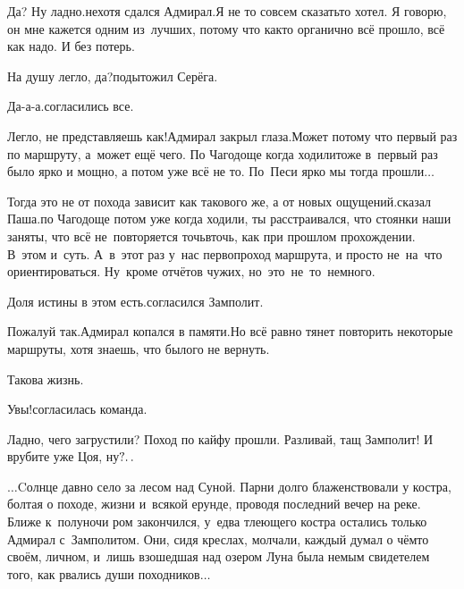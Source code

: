 \diagdash Да? Ну ладно.\mdash нехотя сдался Адмирал.\mdash Я не то совсем сказать\sdash то хотел. Я говорю, он мне кажется одним из~лучших, потому что как\sdash то органично всё прошло, всё как надо. И без потерь.

\diagdash На душу легло, да?\mdash подытожил Серёга.

\diagdash Да-а-а.\mdash согласились все.

\diagdash Легло, не представляешь как!\mdash Адмирал закрыл глаза.\mdash Может потому что первый раз по маршруту, а~может ещё чего. По Чагодоще когда ходили\mdash тоже в~первый раз было ярко и мощно, а потом уже всё не то. По~Песи ярко мы тогда прошли$\ldots$

\diagdash Тогда это не от похода зависит как такового же, а от новых ощущений.\mdash сказал Паша.\mdash по Чагодоще потом уже когда ходили, ты расстраивался, что стоянки наши заняты, что всё не~повторяется точь\sdash в\sdash точь, как при прошлом прохождении. В~этом и~суть. А~в~этот раз у~нас первопроход маршрута, и просто не~на~что ориентироваться. Ну~кроме отчётов чужих, но~это~не~то~немного.

\diagdash Доля истины в этом есть.\mdash согласился Замполит.

\diagdash Пожалуй так.\mdash Адмирал копался в памяти.\mdash Но всё равно тянет повторить некоторые маршруты, хотя знаешь, что былого не вернуть.

\diagdash Такова жизнь.

\diagdash Увы!\mdash согласилась команда.

\diagdash Ладно, чего загрустили? Поход по кайфу прошли. Разливай, тащ Замполит! И врубите уже Цоя, ну$\mathpunct{?\ldotp\ldotp}$ %

\vspace{1em}
$\ldots$Cолнце давно село за лесом над Суной. Парни долго блаженствовали у костра, болтая о походе, жизни и~всякой ерунде, проводя последний вечер на реке. Ближе к~полуночи ром закончился, у~едва тлеющего костра остались только Адмирал с~Замполитом. Они, сидя креслах, молчали, каждый думал о чём\sdash то своём, личном, и~лишь взошедшая над озером Луна была немым свидетелем того, как рвались души походников$\ldots$


\begin{center}
\end{center}
